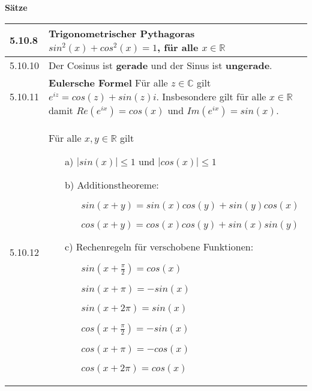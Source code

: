     \pagebreak

    \noindent 
    \textbf{Sätze}
    \begin{table}[H]
    \begin{tabularx}{\textwidth}{X m{16cm}}
        \toprule

        5.10.8& \textbf{Trigonometrischer Pythagoras}\hfill \break
                $sin^2(x) + cos^2(x) = 1$, für alle $x \in \mathbb{R}$ \\
        \midrule
        5.10.10&Der Cosinus ist \textbf{gerade} und der Sinus ist \textbf{ungerade}. \\
        \midrule
        5.10.11&\textbf{Eulersche Formel} \hfill \break
                Für alle $z \in \mathbb{C}$ gilt $e^{iz} = cos(z)+sin(z)i$. \hfill \break
                Insbesondere gilt für alle $x \in \mathbb{R}$ damit $Re(e^{ix}) = cos(x)$ und $Im(e^{ix})=sin(x)$. \\
        \midrule
        5.10.12&Für alle $x,y \in \mathbb{R}$ gilt 
                \begin{itemize}[topsep=-0.5cm]
                    \item[a)] $|sin(x)| \leq 1$ und $|cos(x)| \leq 1$
                    \item[b)] Additionstheoreme:
                                \begin{itemize}[topsep=-0.5cm]
                                    \item[] $sin(x+y) = sin(x)cos(y)+sin(y)cos(x)$
                                    \item[] $cos(x+y) = cos(x)cos(y)+sin(x)sin(y)$ 
                                \end{itemize}
                    \item[c)] Rechenregeln für verschobene Funktionen:
                                \begin{itemize}[topsep=-0.5cm]
                                    \item[] $sin(x + \frac{\pi}{2}) = cos(x)$
                                    \item[] $sin(x + \pi) = -sin(x)$
                                    \item[] $sin(x+2\pi) = sin(x)$
                                    \item[] $cos(x + \frac{\pi}{2}) = -sin(x)$
                                    \item[] $cos(x+\pi) = -cos(x)$
                                    \item[] $cos(x+2\pi) = cos(x)$

\end{itemize}
\end{itemize}
\end{tabularx}
\end{table}

